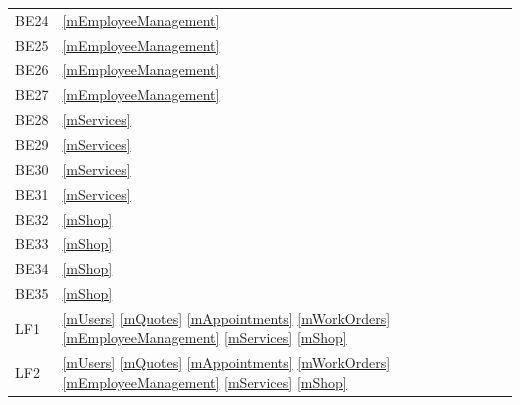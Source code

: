\documentclass[12pt, titlepage]{article}
\begin{document}
\begin{longtable}{p{} p{}}
	BE24                  & \ref{mEmployeeManagement}                                                                                              \\
	BE25                  & \ref{mEmployeeManagement}                                                                                              \\
	BE26                  & \ref{mEmployeeManagement}                                                                                              \\
	BE27                  & \ref{mEmployeeManagement}                                                                                              \\
	BE28                  & \ref{mServices}                                                                                                        \\
	BE29                  & \ref{mServices}                                                                                                        \\
	BE30                  & \ref{mServices}                                                                                                        \\
	BE31                  & \ref{mServices}                                                                                                        \\
	BE32                  & \ref{mShop}                                                                                                            \\
	BE33                  & \ref{mShop}                                                                                                            \\
	BE34                  & \ref{mShop}                                                                                                            \\
	BE35                  & \ref{mShop}                                                                                                            \\
	LF1                   & \ref{mUsers} \ref{mQuotes} \ref{mAppointments} \ref{mWorkOrders} \ref{mEmployeeManagement} \ref{mServices} \ref{mShop} \\
	LF2                   & \ref{mUsers} \ref{mQuotes} \ref{mAppointments} \ref{mWorkOrders} \ref{mEmployeeManagement} \ref{mServices} \ref{mShop} \\

\end{longtable}
\end{document}
